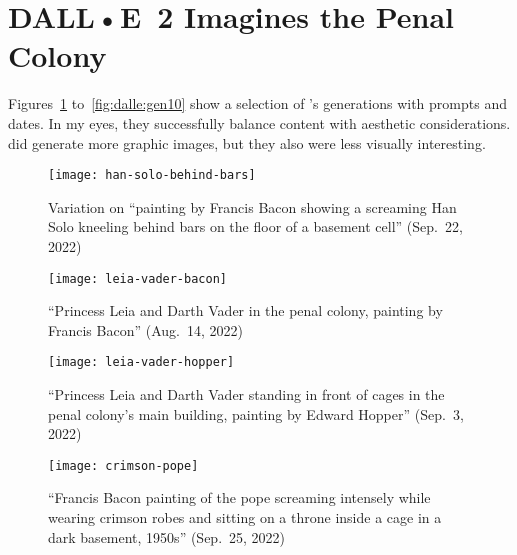 
\newpage
\section{DALL•E~2 Imagines the Penal Colony}
\label{adx:dalle:fromkafkawithlove}

Figures~\ref{fig:dalle:gen1} to~\ref{fig:dalle:gen10} show a selection of
\DALLE's generations with prompts and dates. In my eyes, they successfully
balance content with aesthetic considerations. \DALLE{} did generate more
graphic images, but they also were less visually interesting.

\begin{figure}[h!]
\centering
\begin{minipage}[t]{0.48\textwidth}
    \centering
    \vspace{2em}
    \texttt{[image: han-solo-behind-bars]}
    \caption{Variation on ``painting by Francis Bacon showing a screaming Han
        Solo kneeling behind bars on the floor of a basement cell'' (Sep.\ 22,
        2022)}
    \label{fig:dalle:gen1}
\end{minipage}
\hfill
\begin{minipage}[t]{0.48\textwidth}
    \centering
    \vspace{2em}
    \texttt{[image: leia-vader-bacon]}
    \caption{``Princess Leia and Darth Vader in the penal colony, painting by
        Francis Bacon'' (Aug.\ 14, 2022)}
\end{minipage}
\end{figure}

\begin{figure}[h!]
\begin{minipage}[t]{0.48\textwidth}
    \centering
    \vspace{2.5em}
    \texttt{[image: leia-vader-hopper]}
    \caption{``Princess Leia and Darth Vader standing in front of cages in the
        penal colony's main building, painting by Edward Hopper'' (Sep.\ 3,
        2022)}
\end{minipage}
\hfill
\begin{minipage}[t]{0.48\textwidth}
    \centering
    \vspace{2.5em}
    \texttt{[image: crimson-pope]}
    \caption{``Francis Bacon painting of the pope screaming intensely while
        wearing crimson robes and sitting on a throne inside a cage in a dark
        basement, 1950s'' (Sep.\ 25, 2022)}
\end{minipage}
\end{figure}

